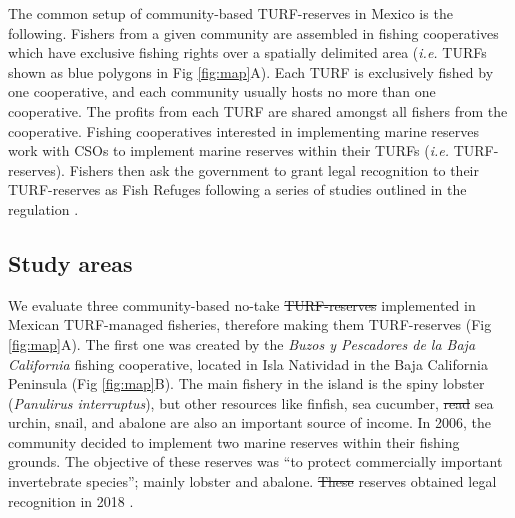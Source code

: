 \documentclass{frontiersSCNS}
\providecommand{\DIFaddtex}[1]{{\protect\color{blue}\uwave{#1}}} %
\providecommand{\DIFdeltex}[1]{{\protect\color{red}\sout{#1}}}                      %
\providecommand{\DIFaddbegin}{} %
\providecommand{\DIFaddend}{} %
\providecommand{\DIFdelbegin}{} %
\providecommand{\DIFdelend}{} %
\providecommand{\DIFadd}[1]{\texorpdfstring{\DIFaddtex{#1}}{#1}} %
\providecommand{\DIFdel}[1]{\texorpdfstring{\DIFdeltex{#1}}{}} %
\begin{document}
The \DIFaddbegin \DIFadd{most }\DIFaddend common setup of community-based TURF-reserves in Mexico is the
following. Fishers from a given community are assembled in fishing
cooperatives which have exclusive fishing rights over a spatially
delimited area (\emph{i.e.} TURFs shown as blue polygons in Fig
\ref{fig:map}A). Each TURF is exclusively fished by one cooperative, and
each community usually hosts no more than one cooperative. The profits
from each TURF are shared amongst all fishers from the cooperative.
Fishing cooperatives interested in implementing marine reserves work
with CSOs to implement marine reserves within their TURFs (\emph{i.e.}
TURF-reserves). Fishers then ask the government to grant legal
recognition to their TURF-reserves as Fish Refuges following a series of
studies outlined in the regulation \citep{nom}.

\hypertarget{study-areas}{%
\subsection{Study areas}\label{study-areas}}

We evaluate three community-based no-take \DIFdelbegin \DIFdel{TURF-reserves }\DIFdelend \DIFaddbegin \DIFadd{TURF-reserve systems
}\DIFaddend implemented in Mexican TURF-managed fisheries, therefore making them
TURF-reserves (Fig \ref{fig:map}A). The first one was created by the
\emph{Buzos y Pescadores de la Baja California} fishing cooperative,
located in Isla Natividad in the Baja California Peninsula (Fig
\ref{fig:map}B). The main fishery in the island is the spiny lobster
(\emph{Panulirus interruptus}), but other resources like finfish, sea
cucumber, \DIFdelbegin \DIFdel{read }\DIFdelend sea urchin, snail, and abalone are also an important source of
income. In 2006, the community decided to implement two marine reserves
within their fishing grounds. The objective of these reserves was ``to
protect commercially important invertebrate species''; mainly lobster
and abalone. \DIFdelbegin \DIFdel{These }\DIFdelend \DIFaddbegin \DIFadd{The }\DIFaddend reserves obtained legal recognition in 2018
\citep{dof_website_2018}.
\end{document}
